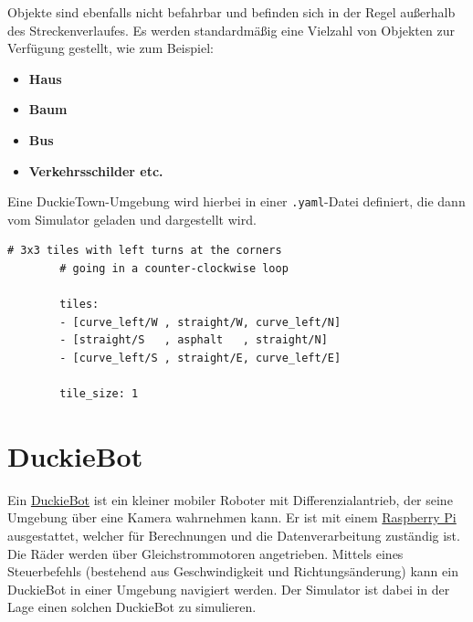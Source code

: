 Objekte sind ebenfalls nicht befahrbar und befinden sich in der Regel außerhalb des Streckenverlaufes. Es werden standardmäßig eine Vielzahl von Objekten zur Verfügung gestellt, wie zum Beispiel:

\newpage

\begin{itemize}
	\item \textbf{Haus}
	\item \textbf{Baum}
	\item \textbf{Bus}
	\item \textbf{Verkehrsschilder etc.}
\end{itemize}

Eine DuckieTown-Umgebung wird hierbei in einer \texttt{.yaml}-Datei definiert, die dann vom Simulator geladen und dargestellt wird.

\hspace{1cm}
\begin{minipage}{.73\linewidth}
	\begin{lstlisting}[caption={Beispieldefinition einer DuckieTown-Umgebung}]
		# 3x3 tiles with left turns at the corners
		# going in a counter-clockwise loop
	
		tiles:
		- [curve_left/W , straight/W, curve_left/N]
		- [straight/S   , asphalt   , straight/N]
		- [curve_left/S , straight/E, curve_left/E]
	
		tile_size: 1
	\end{lstlisting}
\end{minipage}

\section{DuckieBot}
\label{duckiebot}

Ein \href{https://get.duckietown.com/products/duckiebot-db18}{DuckieBot} ist ein kleiner mobiler Roboter mit Differenzialantrieb, der seine Umgebung über eine Kamera wahrnehmen kann. Er ist mit einem \href{https://www.raspberrypi.org/}{Raspberry Pi} ausgestattet, welcher für Berechnungen und die Datenverarbeitung zuständig ist. Die  Räder werden über Gleichstrommotoren angetrieben. Mittels eines Steuerbefehls (bestehend aus Geschwindigkeit und Richtungsänderung) kann ein DuckieBot in einer Umgebung navigiert werden. \cite{duckietown_platform}
Der Simulator ist dabei in der Lage einen solchen DuckieBot zu simulieren.


